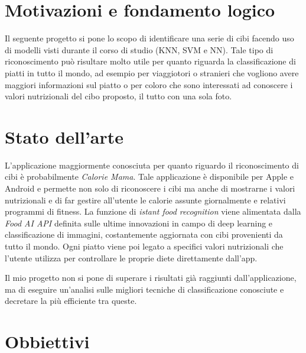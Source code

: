 \documentclass[11pt, a4paper, titlepage]{article}
\begin{document}
\begin{frontespizio}
\Margini{2.5cm}{3cm}{2.5cm}{3cm}
\Sottotitolo{}
\end{frontespizio}
%


\tableofcontents
\newpage

\section{Motivazioni e fondamento logico}
Il seguente progetto si pone lo scopo di identificare una serie di cibi facendo uso di modelli visti durante il corso di studio (KNN, SVM e NN). Tale tipo di riconoscimento può risultare molto utile per quanto riguarda la classificazione di piatti in tutto il mondo, ad esempio per viaggiotori o stranieri che vogliono avere maggiori informazioni sul piatto o per coloro che sono interessati ad conoscere i valori nutrizionali del cibo proposto, il tutto con una sola foto. 

\section{Stato dell'arte}
L'applicazione maggiormente conosciuta per quanto riguardo il riconoscimento di cibi è probabilmente \emph{Calorie Mama}. Tale applicazione è disponibile per Apple e Android e permette non solo di riconoscere i cibi ma anche di mostrarne i valori nutrizionali e di far gestire all'utente le calorie assunte giornalmente e relativi programmi di fitness. La funzione di \textit{istant food recognition} viene alimentata dalla \textit{Food AI API} definita sulle ultime innovazioni in campo di deep learning e classificazione di immagini, costantemente aggiornata con cibi provenienti da tutto il mondo. Ogni piatto viene poi legato a specifici valori nutrizionali che l'utente utilizza per controllare le proprie diete direttamente dall'app.

\medskip
Il mio progetto non si pone di superare i risultati già raggiunti dall'applicazione, ma di eseguire un'analisi sulle migliori tecniche di classificazione conosciute e decretare la più efficiente tra queste. 

\section{Obbiettivi}
\end{document}
